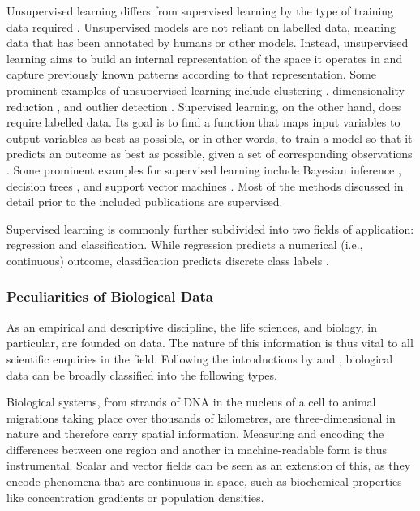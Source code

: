 Unsupervised \label{%
mar:supunsup} learning differs from supervised learning by the type of
training data required \citep{Hinton1999}. Unsupervised  models are not
reliant on labelled data, meaning data that has been annotated by humans or
other models. Instead, unsupervised learning aims to build an internal
representation of the space it operates in and capture previously known
patterns according to that representation. Some prominent examples of
unsupervised learning include clustering \citep{Rokach2005}, dimensionality
reduction \citep{VanDerMaaten2009}, and outlier detection \citep{Hawkins1980}.
Supervised learning, on the other hand, does require labelled data. Its goal
is to find a function that maps input variables to output variables as best as
possible, or in other words, to train a model so that it predicts an outcome
as best as possible, given a set of corresponding observations \citep{%
Mohri2018}. Some prominent examples for supervised learning include Bayesian 
inference \citep{Gelman2014}, decision trees \citep{Kaminski2018}, and support 
vector machines \citep{Cortes1995}. Most of the methods discussed in detail
prior to the included publications are supervised.

Supervised learning is commonly further subdivided into two fields of
application: regression and classification. While regression predicts a
numerical (i.e., continuous) outcome, classification predicts discrete class
labels \citep{James2009}.


\subsubsection{Peculiarities of Biological Data}\label{subsubsec:biodata}
As an empirical and descriptive discipline, the life sciences, and biology, in
particular, are founded on data. The nature of this information is thus vital
to all scientific enquiries in the field. Following the introductions by
\citet{Jagadish2003} and \citet{Wooley2006}, biological data can be broadly
classified into the following types.
\medbreak

\noindent
Biological\label{mar:dataspatial} systems, from
strands of DNA in the nucleus of a cell to animal migrations taking place over
thousands of kilometres, are three-dimensional in nature and therefore carry
spatial information. Measuring and encoding the differences between one region
and another in machine-readable form is thus instrumental. Scalar and vector
fields can be seen as an extension of this, as they encode phenomena that are
continuous in space, such as biochemical properties like concentration
gradients or population densities.
\medbreak


